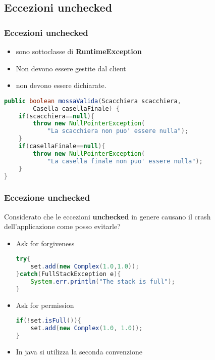 \documentclass{beamer}
\begin{document}
\subsection{Eccezioni unchecked}
\begin{frame}[fragile]
\frametitle{Eccezioni unchecked}
\begin{itemize}
\item sono sottoclasse di \textbf{RuntimeException}
\item Non devono essere gestite dal client 
\item non devono essere dichiarate.
\end{itemize}
\begin{framed}
\begin{lstlisting}[language=Java]
public boolean mossaValida(Scacchiera scacchiera, 
        Casella casellaFinale) {
    if(scacchiera==null){
        throw new NullPointerException(
            "La scacchiera non puo' essere nulla");
    }
    if(casellaFinale==null){
        throw new NullPointerException(
            "La casella finale non puo' essere nulla");
    }
}
\end{lstlisting}
\end{framed}
\end{frame}


\begin{frame}[fragile]
\frametitle{Eccezione unchecked}
Considerato che le eccezioni \textbf{unchecked} in genere causano il crash dell'applicazione come posso evitarle?
\begin{itemize}
\item Ask for forgiveness
\begin{lstlisting}[language=Java]
try{
    set.add(new Complex(1.0,1.0));
}catch(FullStackException e){
    System.err.println("The stack is full");
}
\end{lstlisting}
\item Ask for permission
\begin{lstlisting}[language=Java]
if(!set.isFull()){
    set.add(new Complex(1.0, 1.0));
}
\end{lstlisting}
\item In java si utilizza la seconda convenzione
\end{itemize}
\end{frame}
\end{document}
